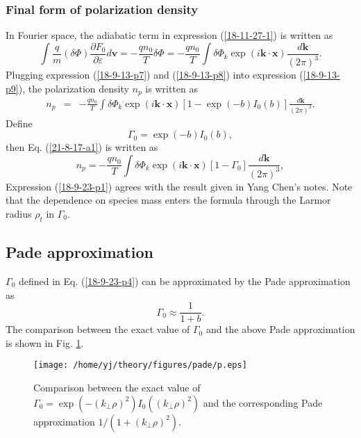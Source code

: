 \documentclass{llncs}
\begin{document}
\subsubsection{Final form of polarization density}

In Fourier space, the adiabatic term in expression (\ref{18-11-27-1}) is
written as
\begin{equation}
  \label{18-9-13-p8} \int \frac{q}{m} (\delta \Phi) \frac{\partial
  F_0}{\partial \varepsilon} d\mathbf{v}= - \frac{q n_0}{T} \delta \Phi = -
  \frac{q n_0}{T}  \int \delta \Phi_k \exp (i\mathbf{k} \cdot \mathbf{x})
  \frac{d\mathbf{k}}{(2 \pi)^3} .
\end{equation}
Plugging expression (\ref{18-9-13-p7}) and (\ref{18-9-13-p8}) into expression
(\ref{18-9-13-p9}), the polarization density $n_p$ is written as
\begin{eqnarray}
  n_p & = & - \frac{q n_0}{T} \int \delta \Phi_k \exp (i\mathbf{k} \cdot
  \mathbf{x}) [1 - \exp (- b) I_0 (b)] \frac{d\mathbf{k}}{(2 \pi)^3} . 
  \label{21-8-17-a1}
\end{eqnarray}
Define
\begin{equation}
  \label{18-9-23-p4} \Gamma_0 = \exp (- b) I_0 (b),
\end{equation}
then Eq. (\ref{21-8-17-a1}) is written as
\begin{equation}
  \label{18-9-23-p1} n_p = - \frac{q n_0}{T} \int \delta \Phi_k \exp
  (i\mathbf{k} \cdot \mathbf{x}) [1 - \Gamma_0] \frac{d\mathbf{k}}{(2 \pi)^3},
\end{equation}
Expression (\ref{18-9-23-p1}) agrees with the result given in Yang Chen's
notes. Note that the dependence on species mass enters the formula through the
Larmor radius $\rho_t$ in $\Gamma_0$.

\subsection{Pade approximation}

$\Gamma_0$ defined in Eq. (\ref{18-9-23-p4}) can be approximated by the Pade
approximation as
\begin{equation}
  \label{18-10-23-p1} \Gamma_0 \approx \frac{1}{1 + b} .
\end{equation}
The comparison between the exact value of $\Gamma_0$ and the above Pade
approximation is shown in Fig. \ref{18-9-23-e1}.

\begin{figure}[h]
  \texttt{[image: /home/yj/theory/figures/pade/p.eps]}
  \caption{\label{18-9-23-e1}Comparison between the exact value of $\Gamma_0 =
  \exp (- (k_{\perp} \rho)^2) I_0 ((k_{\perp} \rho)^2)$ and the corresponding
  Pade approximation $1 / (1 + (k_{\perp} \rho)^2)$.}
\end{figure}
\end{document}
